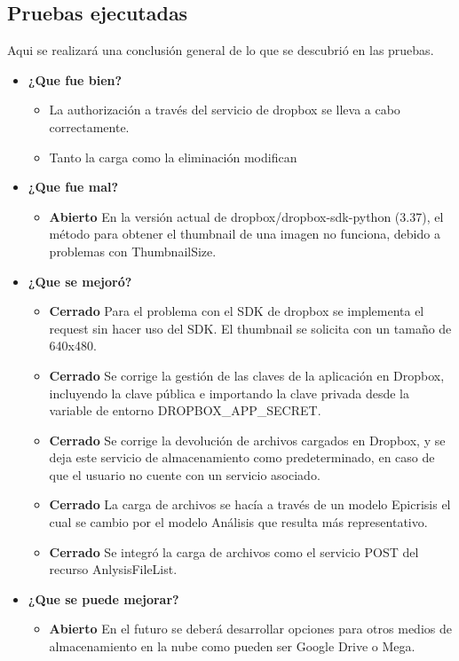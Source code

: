 \documentclass[a4paper,12pt]{article}
\begin{document}
\subsection{Pruebas ejecutadas}
Aqui se realizará una conclusión general de lo que se descubrió en las pruebas.
	\begin{itemize}
		\item \textbf{¿Que fue bien?}
        	\begin{itemize}
				\item La authorización a través del servicio de dropbox se lleva a cabo correctamente.
				\item Tanto la carga como la eliminación modifican
			\end{itemize}
		\item \textbf{¿Que fue mal?}
        	\begin{itemize}
	          \item \textbf{Abierto} En la versión actual de dropbox/dropbox-sdk-python (3.37), el método para obtener el thumbnail de una imagen no funciona, debido a problemas con ThumbnailSize.
			\end{itemize}

   		\item \textbf{¿Que se mejoró?}
        	\begin{itemize}
                \item \textbf{Cerrado} Para el problema con el SDK de dropbox se implementa el request sin hacer uso del SDK. El thumbnail se solicita con un tamaño de 640x480.
                \item \textbf{Cerrado} Se corrige la gestión de las claves de la aplicación en Dropbox, incluyendo la clave pública e importando la clave privada desde la variable de entorno DROPBOX\_APP\_SECRET.
                \item \textbf{Cerrado} Se corrige la devolución de archivos cargados en Dropbox, y se deja este servicio de almacenamiento como predeterminado, en caso de que el usuario no cuente con un servicio asociado.
                \item \textbf{Cerrado} La carga de archivos se hacía a través de un modelo Epicrisis el cual se cambio por el modelo Análisis que resulta más representativo.
                \item \textbf{Cerrado} Se integró la carga de archivos como el servicio POST del recurso AnlysisFileList.
			\end{itemize}

   		\item \textbf{¿Que se puede mejorar?}
        	\begin{itemize}
		        \item \textbf{Abierto} En el futuro se deberá desarrollar opciones para otros medios de almacenamiento en la nube como pueden ser Google Drive o Mega.
            \end{itemize}
        

	\end{itemize}
\end{document}
